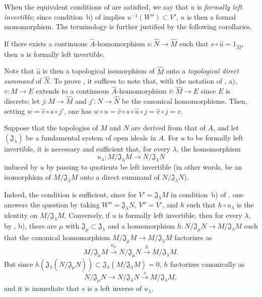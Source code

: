 When the equivalent conditions of  are satisfied, we say that $u$ is \emph{formally left invertible};
since condition~b) of  implies $u^{-1}(W'')\subset V'$, $u$ is then a formal monomorphism.
The terminology is further justified by the following corollaries.

\begin{corollary}[19.1.6]
\label{0.19.1.6}
If there exists a continuous $\widehat A$-homomorphism $s:\widehat N\to\widehat M$ such that $s\circ\widehat u=1_{\widehat M}$, then $u$ is formally left invertible.
\end{corollary}

Note that $\widehat u$ is then a topological isomorphism of $\widehat M$ onto a \emph{topological direct summand} of $\widehat N$.
To prove , it suffices to note that, with the notation of , a), $v:M\to E$ extends to a continuous $\widehat A$-homomorphism $\widehat v:\widehat M\to E$ since $E$ is discrete;
let $j:M\to\widehat M$ and $j':N\to\widehat N$ be the canonical homomorphisms.
Then, setting $w=\widehat v\circ s\circ j'$, one has $w\circ u=\widehat v\circ s\circ\widehat u\circ j=\widehat v\circ j=v$.

\begin{corollary}[19.1.7]
\label{0.19.1.7}
Suppose that the topologies of $M$ and $N$ are derived from that of $A$, and let $(\mathfrak J_\lambda)$ be a fundamental system of open ideals in $A$.
For $u$ to be formally left invertible, it is necessary and sufficient that, for every $\lambda$, the homomorphism
\[
  u_\lambda:M/\mathfrak J_\lambda M\longrightarrow N/\mathfrak J_\lambda N
\]
induced by $u$ by passing to quotients be left invertible (in other words, be an isomorphism of $M/\mathfrak J_\lambda M$ onto a direct summand of $N/\mathfrak J_\lambda N$).
\end{corollary}

Indeed, the condition is sufficient, since for $V'=\mathfrak J_\lambda M$ in condition~b) of , one answers the question by taking $W''=\mathfrak J_\lambda N$, $V''=V'$, and $h$ such that $h\circ u_\lambda$ is the identity on $M/\mathfrak J_\lambda M$.
Conversely, if $u$ is formally left invertible, then for every $\lambda$, by , b), there are $\mu$ with $\mathfrak J_\mu\subset\mathfrak J_\lambda$ and a homomorphism $h:N/\mathfrak J_\mu N\to M/\mathfrak J_\lambda M$ such that the canonical homomorphism $M/\mathfrak J_\mu M\to M/\mathfrak J_\lambda M$ factorizes as
\[
  M/\mathfrak J_\mu M\xrightarrow{u_\mu}N/\mathfrak J_\mu N
  \xrightarrow{h}M/\mathfrak J_\lambda M.
\]
But since
$h(\mathfrak J_\lambda(N/\mathfrak J_\mu N))
 \subset\mathfrak J_\lambda(M/\mathfrak J_\lambda M)=0$,
$h$ factorizes canonically as
\[
  N/\mathfrak J_\mu N\longrightarrow N/\mathfrak J_\lambda N
  \xrightarrow{s}M/\mathfrak J_\lambda M,
\]
and it is immediate that $s$ is a left inverse of $u_\lambda$.

